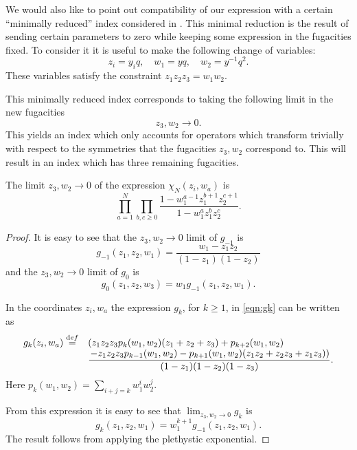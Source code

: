 \iffalse
\parsec{}

We would also like to point out compatibility of our expression with a certain ``minimally reduced'' index considered in \cite{Gaiotto:2021xce}. 
This minimal reduction is the result of sending certain parameters to zero while keeping some expression in the fugacities fixed.
To consider it it is useful to make the following change of variables: 
\begin{equation}
z_i = y_i q, \quad w_1 = yq, \quad w_2 = y^{-1} q^2 .
\end{equation}
These variables satisfy the constraint $z_1 z_2 z_3 = w_1 w_2$. 

This minimally reduced index corresponds to taking the following limit in the new fugacities
\begin{equation}\label{eqn:limitgaitto}
z_3 , w_2 \to 0 .
\end{equation}
This yields an index which only accounts for operators which transform trivially with respect to the symmetries that the fugacities $z_3,w_2$ correspond to. 
This will result in an index which has three remaining fugacities.

\begin{prop}
\label{prop:gaiotto}
The limit $z_3 , w_2 \to 0$ of the expression $\chi_{N}(z_i,w_a)$ is 
\begin{equation}
\prod_{a=1}^N \prod_{b,c \geq 0} \frac{1-w_1^{a-1}z_1^{b+1} z_2^{c+1}}{1-w_1^a z_1^b z_2^c} .
\end{equation}
\end{prop}
\begin{proof}
It is easy to see that the $z_3,w_2 \to 0$ limit of $g_{-1}$ is 
\begin{equation}
g_{-1}(z_1,z_2,w_1) = \frac{w_1 - z_1 z_2}{(1-z_1)(1-z_2)} 
\end{equation}
and the $z_3,w_2 \to 0$ limit of $g_0$ is 
\begin{equation}
g_0(z_1,z_2,w_3) = w_1 g_{-1}(z_1,z_2,w_1) .
\end{equation}

In the coordinates $z_i,w_a$ the expression $g_k$, for $k \geq 1$, in \eqref{eqn:gk} can be written as
\begin{equation}
\label{eqn:gk}
\begin{array}{lllll}
g_k (z_i,w_a) \overset{\mathrm{d}ef}{=} & \left( z_1z_2z_3 p_k(w_1,w_2) (z_1+z_2+z_3) + p_{k+2}(w_1,w_2)  \right. \\
&\displaystyle \frac{\left.  -z_1z_2z_3 p_{k-1}(w_1,w_2) - p_{k+1}(w_1,w_2) (z_1z_2+z_2z_3+z_1z_3) \right)}{(1-z_1)(1-z_2)(1-z_3)} .
\end{array}
\end{equation}
Here $p_k(w_1,w_2) = \sum_{i+j=k} w_1^i w_2^j$. 

From this expression it is easy to see that $\lim_{z_3,w_2 \to 0} g_k$ is 
\begin{equation}
g_k(z_1,z_2,w_1) = w_1^{k+1} g_{-1}(z_1,z_2,w_1) .
\end{equation}
The result follows from applying the plethystic exponential.
\end{proof}

